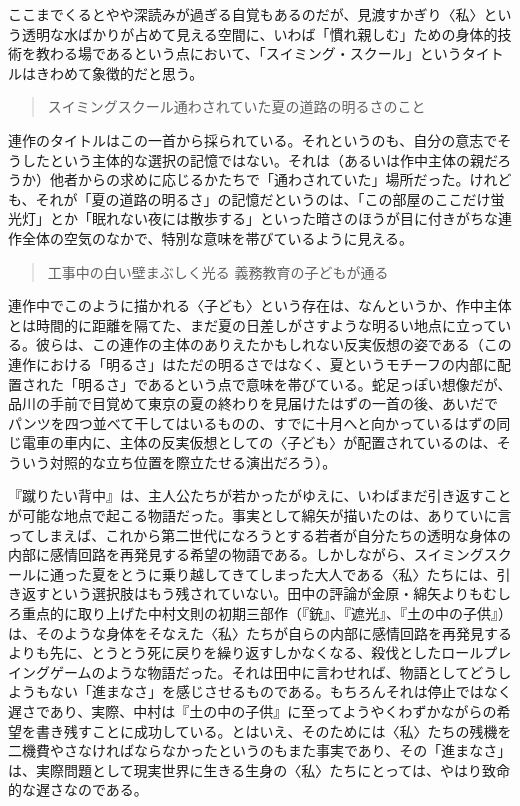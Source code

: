 \documentclass[uplatex,a4paper,oneside,landscape]{jsarticle}
\begin{document}
ここまでくるとやや深読みが過ぎる⾃覚もあるのだが、⾒渡すかぎり〈私〉という透明な⽔ばかりが占めて⾒える空間に、いわば「慣れ親しむ」ための⾝体的技術を教わる場であるという点において、「スイミング・スクール」というタイトルはきわめて象徴的だと思う。

\begin{quote}
スイミングスクール通わされていた夏の道路の明るさのこと
\end{quote}

連作のタイトルはこの⼀⾸から採られている。それというのも、⾃分の意志でそうしたという主体的な選択の記憶ではない。それは（あるいは作中主体の親だろうか）他者からの求めに応じるかたちで「通わされていた」場所だった。けれども、それが「夏の道路の明るさ」の記憶だというのは、「この部屋のここだけ蛍光灯」とか「眠れない夜には散歩する」といった暗さのほうが⽬に付きがちな連作全体の空気のなかで、特別な意味を帯びているように⾒える。

\begin{quote}
⼯事中の⽩い壁まぶしく光る 義務教育の⼦どもが通る
\end{quote}

連作中でこのように描かれる〈⼦ども〉という存在は、なんというか、作中主体とは時間的に距離を隔てた、まだ夏の⽇差しがさすような明るい地点に⽴っている。彼らは、この連作の主体のありえたかもしれない反実仮想の姿である（この連作における「明るさ」はただの明るさではなく、夏というモチーフの内部に配置された「明るさ」であるという点で意味を帯びている。蛇⾜っぽい想像だが、品川の⼿前で⽬覚めて東京の夏の終わりを⾒届けたはずの⼀⾸の後、あいだでパンツを四つ並べて⼲してはいるものの、すでに⼗⽉へと向かっているはずの同じ電⾞の⾞内に、主体の反実仮想としての〈⼦ども〉が配置されているのは、そういう対照的な⽴ち位置を際⽴たせる演出だろう）。

『蹴りたい背中』は、主⼈公たちが若かったがゆえに、いわばまだ引き返すことが可能な地点で起こる物語だった。事実として綿⽮が描いたのは、ありていに⾔ってしまえば、これから第⼆世代になろうとする若者が⾃分たちの透明な⾝体の内部に感情回路を再発⾒する希望の物語である。しかしながら、スイミングスクールに通った夏をとうに乗り越してきてしまった⼤⼈である〈私〉たちには、引き返すという選択肢はもう残されていない。⽥中の評論が⾦原・綿⽮よりもむしろ重点的に取り上げた中村⽂則の初期三部作（『銃』、『遮光』、『⼟の中の⼦供』）は、そのような⾝体をそなえた〈私〉たちが⾃らの内部に感情回路を再発⾒するよりも先に、とうとう死に戻りを繰り返すしかなくなる、殺伐としたロールプレイングゲームのような物語だった。それは⽥中に⾔わせれば、物語としてどうしようもない「進まなさ」を感じさせるものである。もちろんそれは停⽌ではなく遅さであり、実際、中村は『⼟の中の⼦供』に⾄ってようやくわずかながらの希望を書き残すことに成功している。とはいえ、そのためには〈私〉たちの残機を⼆機費やさなければならなかったというのもまた事実であり、その「進まなさ」は、実際問題として現実世界に⽣きる⽣⾝の〈私〉たちにとっては、やはり致命的な遅さなのである。
\end{document}
